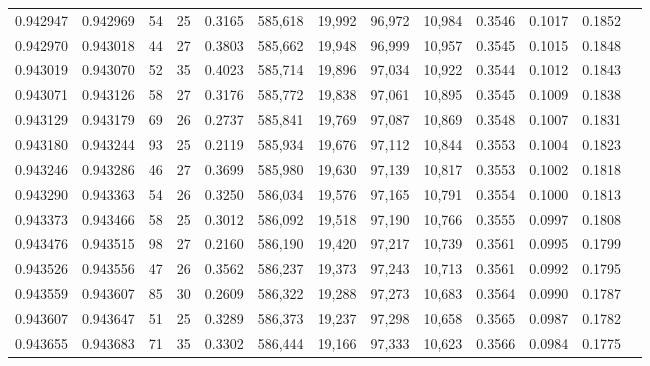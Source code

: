 \begin{tabular}{rrrrrrrrrrrrr}
0.942947 & 0.942969 &    54 &  25 &                                     0.3165 & 585,618 &  19,992 &  96,972 &  10,984 & 0.3546 & 0.1017 & 0.1852 \\
0.942970 & 0.943018 &    44 &  27 &                                     0.3803 & 585,662 &  19,948 &  96,999 &  10,957 & 0.3545 & 0.1015 & 0.1848 \\
0.943019 & 0.943070 &    52 &  35 &                                     0.4023 & 585,714 &  19,896 &  97,034 &  10,922 & 0.3544 & 0.1012 & 0.1843 \\
0.943071 & 0.943126 &    58 &  27 &                                     0.3176 & 585,772 &  19,838 &  97,061 &  10,895 & 0.3545 & 0.1009 & 0.1838 \\
0.943129 & 0.943179 &    69 &  26 &                                     0.2737 & 585,841 &  19,769 &  97,087 &  10,869 & 0.3548 & 0.1007 & 0.1831 \\
0.943180 & 0.943244 &    93 &  25 &                                     0.2119 & 585,934 &  19,676 &  97,112 &  10,844 & 0.3553 & 0.1004 & 0.1823 \\
0.943246 & 0.943286 &    46 &  27 &                                     0.3699 & 585,980 &  19,630 &  97,139 &  10,817 & 0.3553 & 0.1002 & 0.1818 \\
0.943290 & 0.943363 &    54 &  26 &                                     0.3250 & 586,034 &  19,576 &  97,165 &  10,791 & 0.3554 & 0.1000 & 0.1813 \\
0.943373 & 0.943466 &    58 &  25 &                                     0.3012 & 586,092 &  19,518 &  97,190 &  10,766 & 0.3555 & 0.0997 & 0.1808 \\
0.943476 & 0.943515 &    98 &  27 &                                     0.2160 & 586,190 &  19,420 &  97,217 &  10,739 & 0.3561 & 0.0995 & 0.1799 \\
0.943526 & 0.943556 &    47 &  26 &                                     0.3562 & 586,237 &  19,373 &  97,243 &  10,713 & 0.3561 & 0.0992 & 0.1795 \\
0.943559 & 0.943607 &    85 &  30 &                                     0.2609 & 586,322 &  19,288 &  97,273 &  10,683 & 0.3564 & 0.0990 & 0.1787 \\
0.943607 & 0.943647 &    51 &  25 &                                     0.3289 & 586,373 &  19,237 &  97,298 &  10,658 & 0.3565 & 0.0987 & 0.1782 \\
0.943655 & 0.943683 &    71 &  35 &                                     0.3302 & 586,444 &  19,166 &  97,333 &  10,623 & 0.3566 & 0.0984 & 0.1775 \\

\end{tabular}
